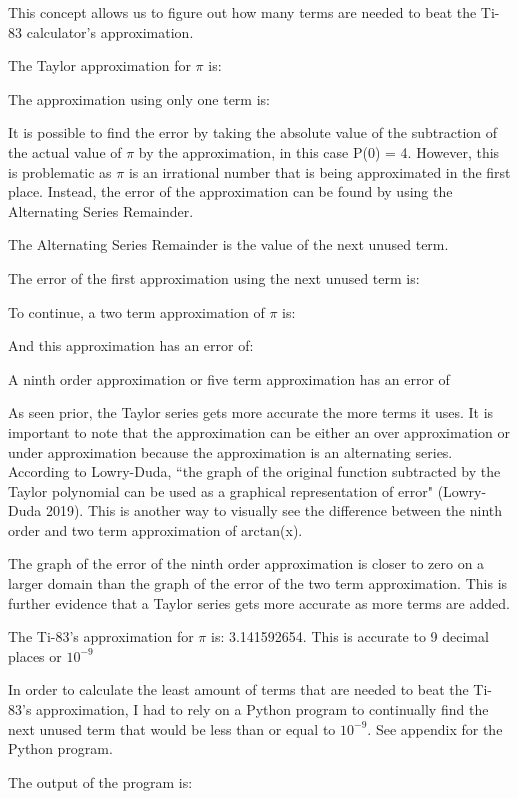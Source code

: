 This concept allows us to figure out how many terms are needed to beat the Ti-83 calculator's approximation.

The Taylor approximation for \(\pi\) is:

The approximation using only one term is:

It is possible to find the error by taking the absolute value of  the subtraction of the actual value of \(\pi\) by the approximation, in this case P(0) = 4. However, this is problematic as \(\pi\) is an irrational number that is being approximated in the first place. Instead, the error of the approximation can be found by using the Alternating Series Remainder.

The Alternating Series Remainder is the value of the next unused term.

The error of the first approximation using the next unused term is:

To continue, a two term approximation of \(\pi\) is:


And this approximation has an error of:


A ninth order approximation or five term approximation has an error of 

As seen prior, the Taylor series gets more accurate the more terms it uses. It is important to note that the approximation can be either an over approximation or under approximation because the approximation is an alternating series. According to Lowry-Duda, ``the graph of the original function subtracted by the Taylor polynomial can be used as a graphical representation of error" (Lowry-Duda 2019). This is another way to visually see the difference between the ninth order and two term approximation of arctan(x). 



The graph of the error of the ninth order approximation is closer to zero on a larger domain than the graph of the error of the two term approximation. This is further evidence that a Taylor series gets more accurate as more terms are added.

The Ti-83's approximation for \(\pi\) is: 3.141592654. This is accurate to 9 decimal places or \(10^{-9}\)

In order to calculate the least amount of terms that are needed to beat the Ti-83's approximation, I had to rely on a Python program to continually find the next unused term that would be less than or equal to \(10^{-9}\). See appendix for the Python program.

The output of the program is:

